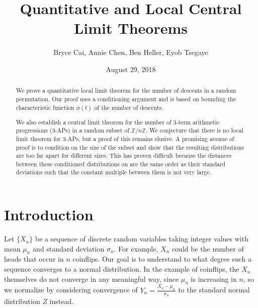 \documentclass[12pt]{article} %
\title{Quantitative and Local Central Limit Theorems}
\author{Bryce Cai, Annie Chen, Ben Heller, Eyob Tsegaye}
\date{August 29, 2018}
\newcommand{\f}[2]{\frac{#1}{#2}}
\newcommand{\Z}{\mathbb{Z}}
\theoremstyle{definition}
\theoremstyle{definition}
\begin{document}
\maketitle

\begin{abstract}
We prove a quantitative local limit theorem for the number of descents in a random permutation. Our proof uses a conditioning argument and is based on bounding the characteristic function $\phi(t)$ of the number of descents.

We also establish a central limit theorem for the number of 3-term arithmetic progressions (3-APs) in a random subset of $\Z/n\Z$.
We conjecture that there is no local limit theorem for 3-APs, but a proof of this remains elusive. A promising avenue of proof is to condition on the size of the subset and show that the resulting distributions are too far apart for different sizes. This has proven difficult because the distances between these conditioned distributions on are the same order as their standard deviations such that the constant multiple between them is not very large.
\end{abstract}

\section{Introduction}

Let $\{X_n\}$ be a sequence of discrete random variables taking integer values with mean $\mu_n$ and standard deviation $\sigma_n$. For example, $X_n$ could be the number of heads that occur in $n$ coinflips. Our goal is to understand to what degree such a sequence converges to a normal distribution. In the example of coinflips, the $X_n$ themselves do not converge in any meaningful way, since $\mu_n$ is increasing in $n$, so we normalize by considering convergence of $Y_n = \f{X_n - \mu_n}{\sigma_n}$ to the standard normal distribution $Z$ instead.
\end{document}
